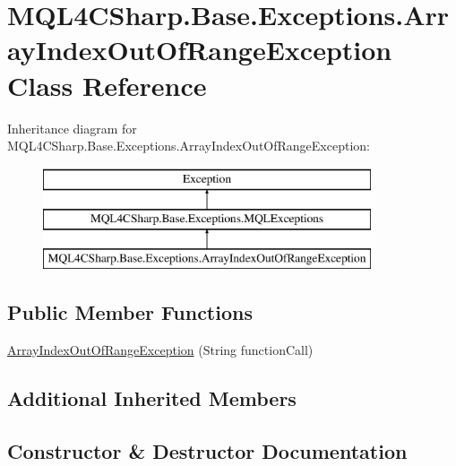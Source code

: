 \hypertarget{class_m_q_l4_c_sharp_1_1_base_1_1_exceptions_1_1_array_index_out_of_range_exception}{}\section{M\+Q\+L4\+C\+Sharp.\+Base.\+Exceptions.\+Array\+Index\+Out\+Of\+Range\+Exception Class Reference}
\label{class_m_q_l4_c_sharp_1_1_base_1_1_exceptions_1_1_array_index_out_of_range_exception}
Inheritance diagram for M\+Q\+L4\+C\+Sharp.\+Base.\+Exceptions.\+Array\+Index\+Out\+Of\+Range\+Exception\+:\begin{figure}[H]
\begin{center}
\leavevmode
\includegraphics[height=3.000000cm]{class_m_q_l4_c_sharp_1_1_base_1_1_exceptions_1_1_array_index_out_of_range_exception}
\end{center}
\end{figure}
\subsection*{Public Member Functions}
\begin{DoxyCompactItemize}
\item 
\hyperlink{class_m_q_l4_c_sharp_1_1_base_1_1_exceptions_1_1_array_index_out_of_range_exception_abb1a2ab40f280ea3a71548bd20f35009}{Array\+Index\+Out\+Of\+Range\+Exception} (String function\+Call)
\end{DoxyCompactItemize}
\subsection*{Additional Inherited Members}


\subsection{Constructor \& Destructor Documentation}
